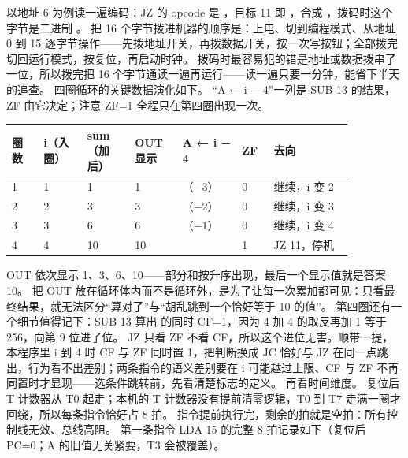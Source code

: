 以地址 6 为例读一遍编码：JZ 的 opcode 是 ，目标 11 即 ，合成 ，拨码时这个字节是二进制 。
把 16 个字节拨进机器的顺序是：上电、切到编程模式、从地址 0 到 15 逐字节操作——先拨地址开关，再拨数据开关，按一次写按钮；全部拨完切回运行模式，按复位，再启动时钟。
拨码时最容易犯的错是地址或数据拨串了一位，所以拨完把 16 个字节通读一遍再运行——读一遍只要一分钟，能省下半天的追查。
四圈循环的关键数据演化如下。
“A ← i − 4”一列是 SUB 13 的结果，ZF 由它决定；注意 ZF=1 全程只在第四圈出现一次。

\begin{longtable}{L{0.08\linewidth}L{0.11\linewidth}L{0.12\linewidth}L{0.12\linewidth}L{0.15\linewidth}L{0.08\linewidth}L{0.20\linewidth}}
\toprule
圈数 & i（入圈） & sum（加后） & OUT 显示 & A ← i − 4 & ZF & 去向 \\
 & 1 & 1 & 1 & （$-3$） & 0 & 继续，i 变 2 \\
2 & 2 & 3 & 3 & （$-2$） & 0 & 继续，i 变 3 \\
3 & 3 & 6 & 6 & （$-1$） & 0 & 继续，i 变 4 \\
4 & 4 & 10 & 10 &  & 1 & JZ 11，停机 \\
\bottomrule
\end{longtable}

OUT 依次显示 1、3、6、10——部分和按升序出现，最后一个显示值就是答案 10。
把 OUT 放在循环体内而不是循环外，是为了让每一次累加都可见：只看最终结果，就无法区分“算对了”与“胡乱跳到一个恰好等于 10 的值”。
第四圈还有一个细节值得记下：SUB 13 算出  的同时 CF=1，因为 4 加 4 的取反再加 1 等于 256，向第 9 位进了位。
JZ 只看 ZF 不看 CF，所以这个进位无害。顺带一提，本程序里 i 到 4 时 CF 与 ZF 同时置 1，把判断换成 JC 恰好与 JZ 在同一点跳出，行为看不出差别；两条指令的语义差别要在 i 可能越过上限、CF 与 ZF 不再同置时才显现——选条件跳转前，先看清楚标志的定义。
再看时间维度。
复位后 T 计数器从 T0 起走；本机的 T 计数器没有提前清零逻辑，T0 到 T7 走满一圈才回绕，所以每条指令恰好占 8 拍。
指令提前执行完，剩余的拍就是空拍：所有控制线无效、总线高阻。
第一条指令 LDA 15 的完整 8 拍记录如下（复位后 PC=0；A 的旧值无关紧要，T3 会被覆盖）。

